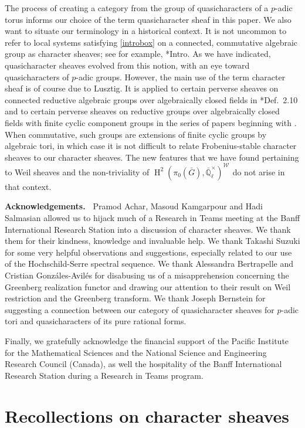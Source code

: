 \documentclass[10pt]{amsart}
\theoremstyle{plain}
\theoremstyle{definition}
\theoremstyle{remark}
\newcommand{\EE}{\mathbb{\bar Q}_\ell}
\newcommand{\EEx}{\EE^\times}
\newcommand{\Weil}[1]{\mathcal{W}_{#1}}
\DeclareMathOperator{\Hh}{H}
\begin{document}
The process of creating a category from the group of quasicharacters of a $p$-adic  torus informs our choice of the term quasicharacter sheaf in this paper.
We also want to situate our terminology in a historical context.
It is not uncommon to refer to local systems satisfying \eqref{introbox} on a connected, commutative algebraic group as character sheaves;
see for example, \cite{kamgarpour:09a}*{Intro}.
As we have indicated, quasicharacter sheaves evolved from this notion,
with an eye toward quasicharacters of $p$-adic groups.
However, the main use of the term character sheaf is of course due to Lusztig.
It is applied to certain perverse sheaves on connected reductive algebraic groups over algebraically closed fields in
\cite{lusztig:85a}*{Def.~2.10} and to certain perverse sheaves on reductive groups
over algebraically closed fields with finite cyclic component groups in the series of papers
beginning with \cite{lusztig:disconnected1}.
When commutative, such groups are extensions of finite cyclic groups by algebraic tori,
in which case it is not difficult to relate Frobenius-stable character sheaves to our character sheaves.
The new features that we have found pertaining to Weil sheaves and the non-triviality of $\Hh^2(\pi_0({\bar G}),\EEx)^{\Weil{}}$ do not arise in that context.

\medskip
\noindent\textbf{Acknowledgements.\ } {Pramod Achar, Masoud Kamgarpour and Hadi Salmasian
allowed us to hijack much of a Research in Teams meeting at the Banff International Research Station into a discussion of
character sheaves.  We thank them for their kindness, knowledge and invaluable help.
We thank Takashi Suzuki for some very helpful observations and suggestions, especially related to our use of the Hochschild-Serre spectral sequence.
We thank Alessandra Bertrapelle and Cristian Gonz\'ales-Avil\'es for disabusing us of a misapprehension concerning the Greenberg realization functor and drawing our attention to their result on Weil restriction and the Greenberg transform.
We thank Joseph Bernstein for suggesting a connection between our category of quasicharacter sheaves for $p$-adic tori and quasicharacters of its pure rational forms.}

{Finally, we gratefully acknowledge the financial support of the Pacific Institute for the Mathematical Sciences and the National Science and Engineering Research Council (Canada), as well the hospitality of the Banff International Research Station during a Research in Teams program.}

\section{Recollections on character sheaves} \label{sec:category}
\end{document}
